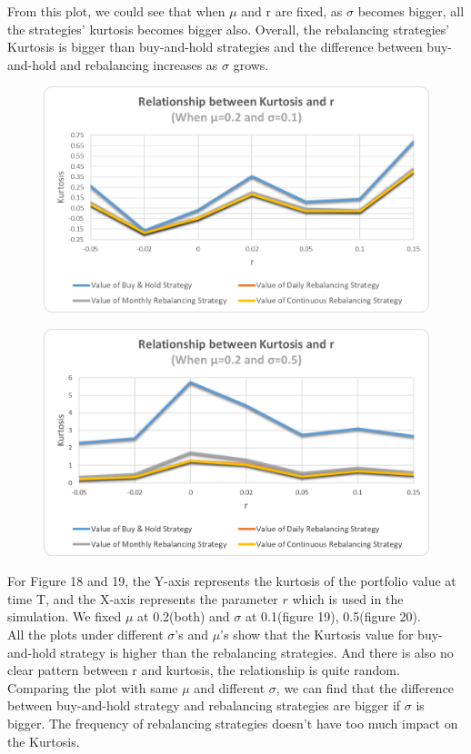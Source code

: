 \documentclass[
10pt, %
a4paper, %
oneside, %
headinclude,footinclude, %
BCOR5mm, %
]{scrartcl}
\begin{document}
From this plot, we could see that when $\mu$ and r are fixed, as $\sigma$ becomes bigger, all the strategies' kurtosis becomes bigger also. Overall, the rebalancing strategies’ Kurtosis is bigger than buy-and-hold strategies and the difference between buy-and-hold and rebalancing increases as $\sigma$ grows.\\
\begin{figure}[H]
	\centering
	\includegraphics[width=0.7\linewidth]{Kurto_r_020_010}
	\caption{}
	\label{fig:kurtor020010}
\end{figure}


\begin{figure}[H]
	\centering
	\includegraphics[width=0.7\linewidth]{Kurto_r_020_050}
	\caption{}
	\label{fig:kurtor020050}
\end{figure}
For Figure 18 and 19, the Y-axis represents the kurtosis of the portfolio value at time T, and the X-axis represents the parameter $r$ which is used in the simulation. We fixed $\mu$ at 0.2(both) and $\sigma$ at 0.1(figure 19), 0.5(figure 20).\\

All the plots under different $\sigma$’s and $\mu$’s show that the Kurtosis value for buy-and-hold strategy is higher than the rebalancing strategies. And there is also no clear pattern between r and kurtosis, the relationship is quite random. Comparing the plot with same $\mu$ and different $\sigma$, we can find that the difference between buy-and-hold strategy and rebalancing strategies are bigger if $\sigma$ is bigger. The frequency of rebalancing strategies doesn’t have too much impact on the Kurtosis. \\
\end{document}
